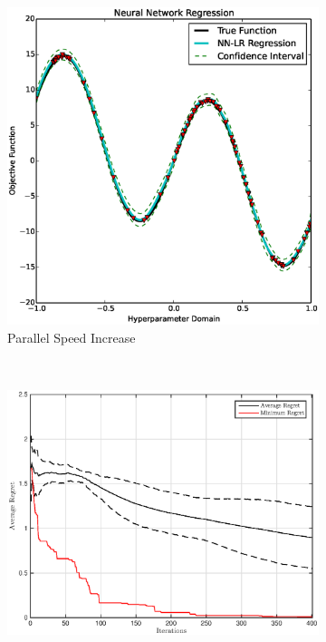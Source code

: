 \documentclass[]{article}
\newcommand{\1}{\mathbf{1}}
\newcommand{\0}{\mathbf{0}}
\begin{document}
\begin{figure}
\centering
\begin{subfigure}[b]{0.3\textwidth}
	\includegraphics[width=\textwidth]{images/regression.eps}
    \caption{Parallel Speed Increase}
 	\label{fig:para}
\end{subfigure}
~ 
\begin{subfigure}[b]{0.3\textwidth}
	\includegraphics[width=\textwidth]{images/gm.eps}

\end{subfigure}
\end{figure}
\end{document}
